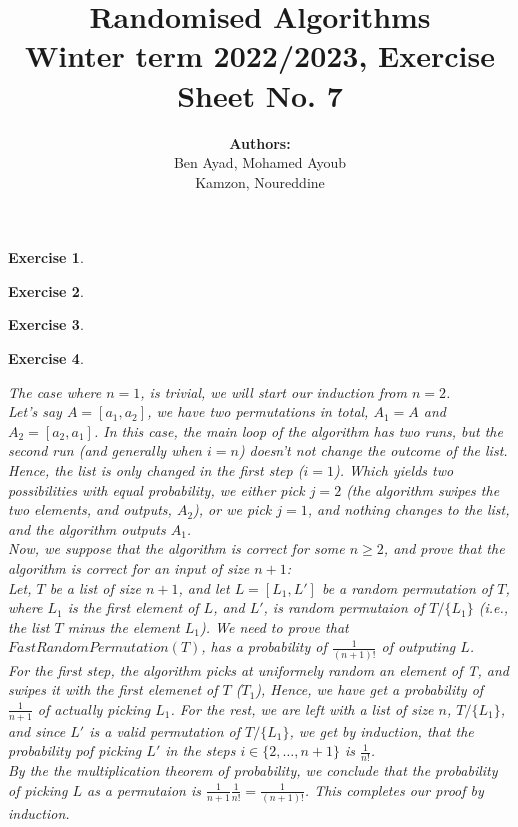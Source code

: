 \documentclass{article}
\title{Randomised Algorithms \\
Winter term 2022/2023, Exercise Sheet No. 7}
\author{
    \textbf{Authors:} \\
    Ben Ayad, Mohamed Ayoub \\
    Kamzon, Noureddine
}
\newtheorem{exo}{Exercise}
\begin{document}
\maketitle

\begin{exo}{\ \\}

\end{exo}

\begin{exo}{\ \\}

\end{exo}

\begin{exo}{\ \\}

\end{exo}

\begin{exo}{\ \\}

The case where $n=1$, is trivial, we will start our induction from $n=2$. \\


Let's say $A = [a_1, a_2]$, we have two permutations in total, $A_1 = A$ and $A_2 = [a_2, a_1]$. In this case, the main loop of the algorithm has two runs, but the second run (and generally when $i=n$) doesn't not change the outcome of the list. Hence, the list is only changed in the first step ($i = 1$). Which yields two possibilities with equal probability, we either pick $j=2$ (the algorithm swipes the two elements, and outputs, $A_2$), or we pick $j=1$, and nothing changes to the list, and the algorithm outputs $A_1$. \\


Now, we suppose that the algorithm is correct for some $n \geq 2$, and prove that the algorithm is correct for an input of size $n+1$: \\

Let, $T$ be a list of size $n+1$, and let $L =  [L_1,L']$ be a random permutation of $T$, where $L_1$ is the first element of $L$, and $L'$, is random permutaion of $T/\{L_1\}$ (i.e., the list $T$ minus the element $L_1$). We need to prove that $FastRandomPermutation(T)$, has a probability of $\frac{1}{(n+1)!}$ of outputing $L$.  \\

For the first step, the algorithm picks at uniformely random an element of T, and swipes it with the first elemenet of $T$ ($T_1$), Hence, we have get a probability of $\frac{1}{n+1}$  of actually picking $L_1$. For the rest, we are left with a list of size $n$, $T/\{L_1\}$, and since $L'$ is a valid permutation of $T/\{L_1\}$, we get by induction, that the probability pof picking $L'$ in the steps $i \in \{2,\dots , n+1\}$ is $\frac{1}{n!}$. \\

By the the multiplication theorem of probability, we conclude that the probability of picking $L$ as a permutaion is $\frac{1}{n+1} \frac{1}{n!} = \frac{1}{(n+1)!}$. This completes our proof by induction.
 
\end{exo}
\end{document}
